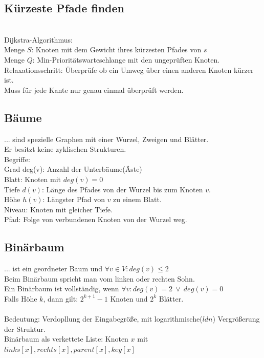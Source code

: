 \documentclass[10pt,a4paper]{scrartcl}
\begin{document}
	\subsection{Kürzeste Pfade finden}
	\\
	Dijkstra-Algorithmus:\\
	Menge $S$: Knoten mit dem Gewicht ihres kürzesten Pfades von $s$\\
	Menge $Q$: Min-Prioritätswarteschlange mit den ungeprüften Knoten.\\ 
	Relaxationsschritt: Überprüfe ob ein Umweg über einen anderen Knoten kürzer ist.\\
	Muss für jede Kante nur genau einmal überprüft werden.

\subsection{Bäume}
... sind spezielle Graphen mit einer Wurzel, Zweigen und Blätter.\\
Er besitzt keine zyklischen Strukturen.\\

Begriffe:\\
Grad deg(v): Anzahl der Unterbäume(Äste)\\
Blatt: Knoten mit $deg(v) = 0$\\
Tiefe $d(v)$: Länge des Pfades von der Wurzel bis zum Knoten $v$.\\ 
Höhe $h(v)$: Längster Pfad von $v$ zu einem Blatt.\\   
Niveau: Knoten mit gleicher Tiefe.\\
Pfad: Folge von verbundenen Knoten von der Wurzel weg.\\

\subsection{Binärbaum}
... ist ein geordneter Baum und $\forall v \in V:deg(v) \le 2$\\
Beim Binärbaum spricht man vom linken oder rechten Sohn.\\
Ein Binärbaum ist vollständig, wenn $\forall v: deg(v) = 2 \ \lor \ deg(v)=0$\\ 
Falls Höhe $k$, dann gilt: $2^{k+1} - 1$ Knoten und $2^k$ Blätter.\\ 
\\
Bedeutung: Verdopllung der Eingabegröße, mit logarithmische($ld n$) Vergrößerung der Struktur.\\
Binärbaum als verkettete Liste: Knoten $x$ mit $links[x],rechts[x], parent[x], key[x]$\\
\end{document}
